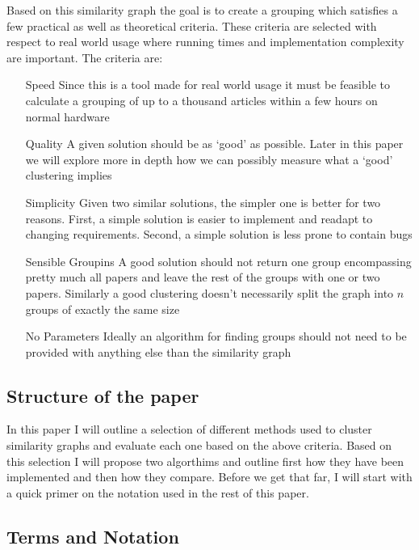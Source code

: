 Based on this similarity graph the goal is to create a grouping which 
satisfies a few practical as well as theoretical criteria. These 
criteria are selected with respect to real world usage where running 
times and implementation complexity are important.  The criteria are:
\begin{itemize}
	\item[Speed]{Since this is a tool made for real world usage it must 
			be feasible to calculate a grouping of up to a thousand 
		articles within a few hours on normal hardware}
	\item[Quality]{A given solution should be as `good' as possible.  
			Later in this paper we will explore more in depth how we can 
		possibly measure what a `good' clustering implies}
	\item[Simplicity]{Given two similar solutions, the simpler one is 
			better for two reasons. First, a simple solution is easier 
			to implement and readapt to changing requirements. Second, a 
		simple solution is less prone to contain bugs}
	\item[Sensible Groupins]{A good solution should not return one group 
			encompassing pretty much all papers and leave the rest of 
			the groups with one or two papers. Similarly a good 
			clustering doesn't necessarily split the graph into $n$ 
		groups of exactly the same size}
	\item[No Parameters]{Ideally an algorithm for finding groups should 
		not need to be provided with anything else than the similarity 
	graph}
\end{itemize}

\subsection{Structure of the paper}

In this paper I will outline a selection of different methods used to 
cluster similarity graphs and evaluate each one based on the above 
criteria. Based on this selection I will propose two algorthims and 
outline first how they have been implemented and then how they compare.  
Before we get that far, I will start with a quick primer on the notation 
used in the rest of this paper.

\subsection{Terms and Notation}

